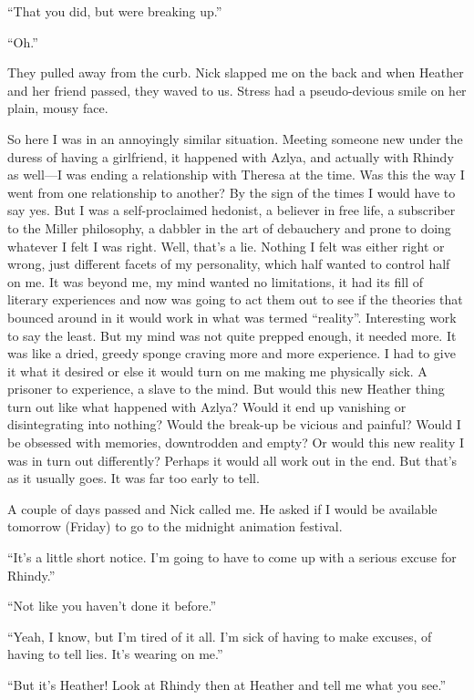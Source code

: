 ``That you did, but were breaking up.''

``Oh.''

They pulled away from the curb. Nick slapped me on the back and when
Heather and her friend passed, they waved to us. Stress had a
pseudo-devious smile on her plain, mousy face.

So here I was in an annoyingly similar situation. Meeting someone new
under the duress of having a girlfriend, it happened with Azlya, and
actually with Rhindy as well---I was ending a relationship with Theresa
at the time. Was this the way I went from one relationship to another?
By the sign of the times I would have to say yes. But I was a
self-proclaimed hedonist, a believer in free life, a subscriber to the
Miller philosophy, a dabbler in the art of debauchery and prone to doing
whatever I felt I was right. Well, that's a lie. Nothing I felt was
either right or wrong, just different facets of my personality, which
half wanted to control half on me. It was beyond me, my mind wanted no
limitations, it had its fill of literary experiences and now was going
to act them out to see if the theories that bounced around in it would
work in what was termed ``reality''. Interesting work to say the least.
But my mind was not quite prepped enough, it needed more. It was like a
dried, greedy sponge craving more and more experience. I had to give it
what it desired or else it would turn on me making me physically sick. A
prisoner to experience, a slave to the mind. But would this new Heather
thing turn out like what happened with Azlya? Would it end up vanishing
or disintegrating into nothing? Would the break-up be vicious and
painful? Would I be obsessed with memories, downtrodden and empty? Or
would this new reality I was in turn out differently? Perhaps it would
all work out in the end. But that's as it usually goes. It was far too
early to tell.

A couple of days passed and Nick called me. He asked if I would be
available tomorrow (Friday) to go to the midnight animation festival.

``It's a little short notice. I'm going to have to come up with a
serious excuse for Rhindy.''

``Not like you haven't done it before.''

``Yeah, I know, but I'm tired of it all. I'm sick of having to make
excuses, of having to tell lies. It's wearing on me.''

``But it's Heather! Look at Rhindy then at Heather and tell me what you
see.''

